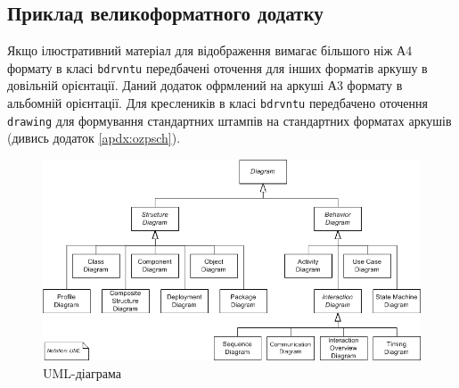 \begin{a3paperl}
\chapter[(Довідковий) Приклад великоформатного додатку]{Приклад великоформатного додатку}\label{apdx:a3}

Якщо ілюстративний матеріал для відображення вимагає більшого ніж А4 формату в класі \verb|bdrvntu| передбачені
оточення для інших форматів аркушу в довільній орієнтації. Даний додаток офрмлений на аркуші А3 формату в альбомній орієнтації.
Для креслеників в класі \verb|bdrvntu| передбачено оточення \verb|drawing| для формування стандартних  штампів на стандартних
форматах аркушів (дивись додаток \ref{apdx:ozpsch}).  

\begin{figure}[h]
 \centering\includegraphics{img/umldiagram.png}
 \caption{UML-діаграма}
 \label{apdxfig:umldiagram}
\end{figure}

\end{a3paperl}

